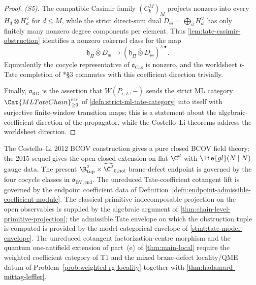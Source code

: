 \begin{proof}
  \emph{(S5).}  The compatible Casimir family
  \((C^M_{\mathfrak h})_M\) projects nonzero into every
  \(H_d\otimes H_d^\vee\) for \(d\le M\), while the strict direct-sum
  dual \(D_\oplus=\bigoplus_dH_d^\vee\) has only finitely many nonzero
  degree components per element.  Thus
  \ref{lem:tate-casimir-obstruction} identifies a nonzero cokernel class
  for the map
  \[
    \mathfrak h_\Pi\widehat\otimes D_\oplus
    \longrightarrow
    (\mathfrak h_\Pi\widehat\otimes D_\oplus)^{\wedge\bullet}.
  \]
  Equivalently the cocycle representative of
  \(\mathfrak o_{\mathrm{Cas}}\) is nonzero, and the worldsheet
  \(t\)-Tate completion of \cite{costello-li-quantum-bcov}*{\S3} commutes
  with this coefficient direction trivially.

  Finally, \(\mathfrak o_{\mathrm{RG}}\) is the assertion that
  \(W(P_{\epsilon,L},-)\) sends the strict ML category
  \(\Cat{MLTateChain}_{\geq0}^{\mathrm{str}}\) of
  \ref{defn:strict-ml-tate-category} into itself with surjective
  finite-window transition maps; this is a statement about the
  algebraic-coefficient direction of the propagator, while the
  Costello--Li theorems address the worldsheet direction.
\end{proof}

\begin{cor}
\label{cor:costello-li-input-coefficient-endpoint}
  The Costello--Li 2012 BCOV construction gives a pure closed BCOV
  field theory; the 2015 sequel gives the open-closed extension on flat
  \(\C^d\) with \(\lie{gl}(N\mid N)\) gauge data.  The present
	  \(\R^2_{\mathrm{top}}\times\widehat{\C^2}_{0,\mathrm{hol}}\)
	  brane-defect endpoint is governed by the four cocycle classes in
	  \(\mathfrak o_{\mathrm{BV,end}}\).  The unreduced Tate-coefficient cotangent
	  lift is governed by the endpoint coefficient data
	  of
  Definition~\ref{defn:endpoint-admissible-coefficient-module}.  The
  classical primitive indecomposable projection on the open observables is
  supplied by the algebraic argument of
  \ref{thm:chain-level-primitive-projection}; the admissible Tate
  envelope on which the obstruction tuple is computed is provided by
  the model-categorical envelope of \ref{stmt:tate-model-envelope}.
  The unreduced cotangent factorization-centre morphism and the
  quantum one-antifield extension of part~(e) of \ref{thm:main-local}
  require the weighted coefficient category of T1 and the mixed
  brane-defect locality/QME datum of
  Problem~\ref{prob:weighted-rg-locality} together with
  \ref{thm:hadamard-mittag-leffler}.
\end{cor}

